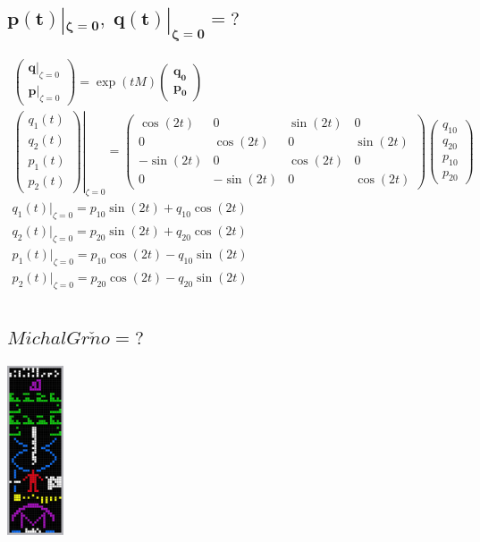 \documentclass[10pt,a4paper]{article}
\newcommand{\mat}[1]{
    \begin{pmatrix}
        #1
    \end{pmatrix}
}
\begin{document}
\subsection{
    \texorpdfstring{
        $\pmb{ p(t)|_{\zeta=0}, \; q(t)|_{\zeta=0} = \mathit{?} }$
    }{
        p(t)|\{z=0\}, q(t)|\{z=0\} = ?
    }
}
\begin{gather*}
    \mat{
        \bm{q}|_{\zeta=0} \\ \bm{p}|_{\zeta=0}
    }
    =
    \exp(tM)
    \mat{
        \bm{q_0} \\ \bm{p_0}
    }
    \\[15pt]
    \left.
    \mat{
        q_1(t) \\ q_2(t) \\ p_1(t) \\ p_2(t)
    }
    \right|_{\zeta=0}
    =
    \mat{\cos{\left(2 t \right)} & 0 & \sin{\left(2 t \right)} & 0\\0 & \cos{\left(2 t \right)} & 0 & \sin{\left(2 t \right)}\\- \sin{\left(2 t \right)} & 0 & \cos{\left(2 t \right)} & 0\\0 & - \sin{\left(2 t \right)} & 0 & \cos{\left(2 t \right)}}
    \mat{
        q_{10} \\ q_{20} \\ p_{10} \\ p_{20}
    }
    \\[20pt]
    q_1(t)|_{\zeta=0} = p_{10} \sin{\left(2 t \right)} + q_{10} \cos{\left(2 t \right)}
    \\[5pt]
    q_2(t)|_{\zeta=0} = p_{20} \sin{\left(2 t \right)} + q_{20} \cos{\left(2 t \right)}
    \\[5pt]
    p_1(t)|_{\zeta=0} = p_{10} \cos{\left(2 t \right)} - q_{10} \sin{\left(2 t \right)}
    \\[5pt]
    p_2(t)|_{\zeta=0} = p_{20} \cos{\left(2 t \right)} - q_{20} \sin{\left(2 t \right)}
    \\[10pt]
\end{gather*}

\subsection{
    \texorpdfstring{
        $\pmb{ \mathit{Michal Gr\check{n}o} = \mathit{?} }$
    }{
        Michal Grňo = ?
    }
}
\centering
\includegraphics[height=5cm,keepaspectratio]{arecibo.png}
\end{document}
